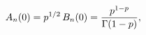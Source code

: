 \[\mathop{A_{n}\/}\nolimits\!\left(0\right)=p^{1/2}\mathop{B_{n}\/}\nolimits\!%
\left(0\right)=\frac{p^{1-p}}{\mathop{\Gamma\/}\nolimits\!\left(1-p\right)},\]